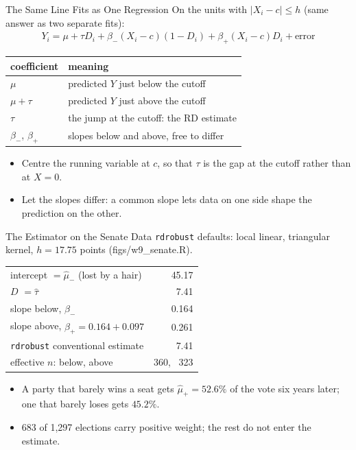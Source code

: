 \documentclass[aspectratio=169,11pt,xcolor=dvipsnames]{beamer}
\newcommand{\srcp}[1]{{\scriptsize\color{gray}(#1)}}
\begin{document}
\begin{frame}{The Same Line Fits as One Regression}
On the units with $|X_i - c| \leq h$ (same answer as two separate fits):
\begin{align*}
  Y_i = \mu + \tau D_i + \beta_-(X_i-c)(1-D_i) + \beta_+(X_i-c)D_i + \text{error}
\end{align*}
\vskip-4pt
\begin{center}\small
\renewcommand{\arraystretch}{1.05}
\begin{tabular}{@{}ll@{}}
\toprule
coefficient & meaning \\
\midrule
$\mu$ & predicted $Y$ just below the cutoff \\
$\mu + \tau$ & predicted $Y$ just above the cutoff \\
$\tau$ & the jump at the cutoff: the RD estimate \\
$\beta_-$, $\beta_+$ & slopes below and above, free to differ \\
\bottomrule
\end{tabular}
\end{center}
\vskip2pt
\begin{itemize}\itemsep1pt
  \item \alert{Centre the running variable at $c$}, so that $\tau$ is the gap at
        the cutoff rather than at $X = 0$.
  \item \alert{Let the slopes differ}: a common slope lets data on one side shape
        the prediction on the other.
\end{itemize}
\end{frame}

\begin{frame}{The Estimator on the Senate Data}
\texttt{rdrobust} defaults: local linear, triangular kernel, $h = 17.75$ points
\srcp{figs/w9\_senate.R}.
\vskip3pt
\begin{center}\small
\renewcommand{\arraystretch}{1.15}
\begin{tabular}{@{}lr@{}}
\toprule
intercept $= \hat\mu_-$ (lost by a hair) & 45.17 \\
$D$ $= \hat\tau$ & 7.41 \\
slope below, $\hat\beta_-$ & 0.164 \\
slope above, $\hat\beta_+ = 0.164 + 0.097$ & 0.261 \\
\midrule
\texttt{rdrobust} conventional estimate & 7.41 \\
effective $n$: below, above & 360, \ 323 \\
\bottomrule
\end{tabular}
\end{center}
\vskip3pt
\begin{itemize}\itemsep2pt
  \item A party that barely wins a seat gets $\hat\mu_+ = 52.6\%$ of the vote six
        years later; one that barely loses gets $45.2\%$.
  \item \alert{683 of 1,297 elections carry positive weight}; the rest do not
        enter the estimate.
\end{itemize}
\end{frame}
\end{document}
